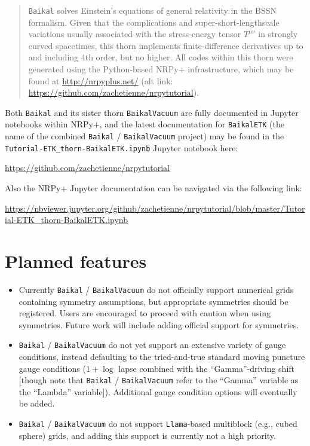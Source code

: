 \newenvironment{packed_enumerate}{
\begin{enumerate}
  \setlength{\itemsep}{0.0pt}
  \setlength{\parskip}{0.0pt}
  \setlength{\parsep}{ 0.0pt}
}{\end{enumerate}}

\begin{abstract}
\texttt{Baikal} solves Einstein's equations of general
relativity in the BSSN formalism. Given that the complications and
super-short-lengthscale variations usually associated with the
stress-energy tensor $T^{\mu\nu}$ in strongly curved spacetimes, this
thorn implements finite-difference derivatives up to and including 4th
order, but no higher. All codes
within this thorn were generated using the Python-based NRPy+
infrastructure, which may be found at \url{http://nrpyplus.net/} (alt
link: \url{https://github.com/zachetienne/nrpytutorial}).
\end{abstract}

Both \texttt{Baikal} and its sister thorn \texttt{BaikalVacuum} are
fully documented in Jupyter notebooks within NRPy+, and
the latest documentation for \texttt{BaikalETK} (the name of the
combined \texttt{Baikal} / \texttt{BaikalVacuum} project) may be found
in the \texttt{Tutorial-ETK\_thorn-BaikalETK.ipynb} Jupyter notebook here:

\url{https://github.com/zachetienne/nrpytutorial}

Also the NRPy+ Jupyter documentation can be navigated via the
following link:

\url{https://nbviewer.jupyter.org/github/zachetienne/nrpytutorial/blob/master/Tutorial-ETK_thorn-BaikalETK.ipynb}

\section{Planned features}

\begin{itemize}
\item Currently \texttt{Baikal} / \texttt{BaikalVacuum} do not officially
support numerical grids containing symmetry assumptions, but
appropriate symmetries should be registered. Users are encouraged to
proceed with caution when using symmetries. Future work will include adding
official support for symmetries.
\item \texttt{Baikal} / \texttt{BaikalVacuum} do not yet support an
  extensive variety of gauge conditions, instead defaulting to the
  tried-and-true standard moving puncture gauge conditions ($1+\log$
  lapse combined with the ``Gamma''-driving shift [though note that
    \texttt{Baikal} / \texttt{BaikalVacuum} refer to the  ``Gamma''
    variable as the ``Lambda'' variable]). Additional gauge condition
  options will eventually be added.
\item \texttt{Baikal} / \texttt{BaikalVacuum} do not support
  \texttt{Llama}-based multiblock (e.g., cubed sphere) grids, and
  adding this support is currently not a high priority.
\end{itemize}


